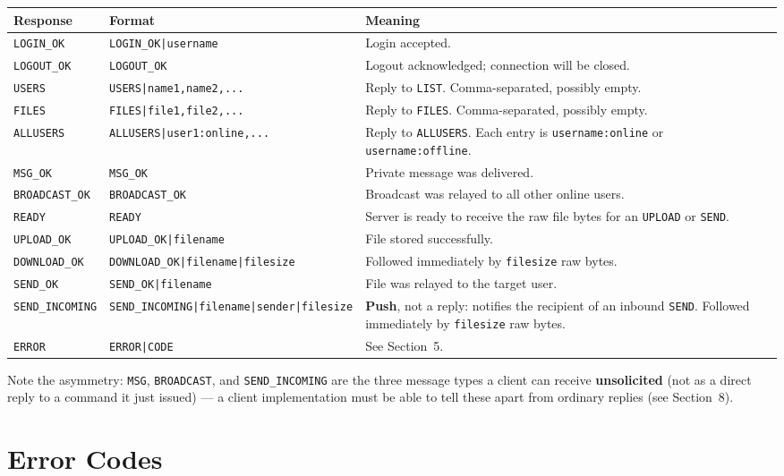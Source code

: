 \documentclass[11pt]{article}
\newcommand{\cmd}[1]{\texttt{#1}}
\begin{document}
\begin{longtable}{@{}p{2.4cm}p{5.2cm}p{6.9cm}@{}}
\toprule
\textbf{Response} & \textbf{Format} & \textbf{Meaning} \\
\midrule
\endhead
\cmd{LOGIN\_OK} & \cmd{LOGIN\_OK|username} & Login accepted. \\
\cmd{LOGOUT\_OK} & \cmd{LOGOUT\_OK} & Logout acknowledged; connection will be closed. \\
\cmd{USERS} & \cmd{USERS|name1,name2,...} & Reply to \cmd{LIST}. Comma-separated, possibly empty. \\
\cmd{FILES} & \cmd{FILES|file1,file2,...} & Reply to \cmd{FILES}. Comma-separated, possibly empty. \\
\cmd{ALLUSERS} & \cmd{ALLUSERS|user1:online,...} & Reply to \cmd{ALLUSERS}. Each entry is \cmd{username:online} or \cmd{username:offline}. \\
\cmd{MSG\_OK} & \cmd{MSG\_OK} & Private message was delivered. \\
\cmd{BROADCAST\_OK} & \cmd{BROADCAST\_OK} & Broadcast was relayed to all other online users. \\
\cmd{READY} & \cmd{READY} & Server is ready to receive the raw file bytes for an \cmd{UPLOAD} or \cmd{SEND}. \\
\cmd{UPLOAD\_OK} & \cmd{UPLOAD\_OK|filename} & File stored successfully. \\
\cmd{DOWNLOAD\_OK} & \cmd{DOWNLOAD\_OK|filename|filesize} & Followed immediately by \cmd{filesize} raw bytes. \\
\cmd{SEND\_OK} & \cmd{SEND\_OK|filename} & File was relayed to the target user. \\
\cmd{SEND\_INCOMING} & \cmd{SEND\_INCOMING|filename|sender|filesize} & \textbf{Push}, not a reply: notifies the recipient of an inbound \cmd{SEND}. Followed immediately by \cmd{filesize} raw bytes. \\
\cmd{ERROR} & \cmd{ERROR|CODE} & See Section~5. \\
\bottomrule
\end{longtable}

Note the asymmetry: \cmd{MSG}, \cmd{BROADCAST}, and \cmd{SEND\_INCOMING}
are the three message types a client can receive \textbf{unsolicited}
(not as a direct reply to a command it just issued) --- a client
implementation must be able to tell these apart from ordinary replies
(see Section~8).

\section{Error Codes}
\end{document}
